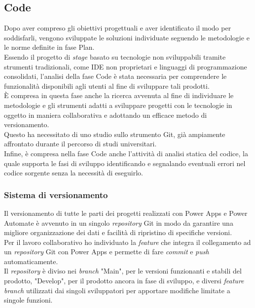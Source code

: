\subsection{Code}
Dopo aver compreso gli obiettivi progettuali e aver identificato il modo per soddisfarli, vengono sviluppate le soluzioni individuate seguendo le metodologie e le norme definite in fase Plan.\\
Essendo il progetto di \emph{stage} basato su tecnologie non sviluppabili tramite strumenti tradizionali, come IDE non proprietari e linguaggi di programmazione consolidati, l'analisi della fase Code è stata necessaria per comprendere le funzionalità disponibili agli utenti al fine di sviluppare tali prodotti.\\
È compresa in questa fase anche la ricerca avvenuta al fine di individuare le metodologie e gli strumenti adatti a sviluppare progetti con le tecnologie in oggetto in maniera collaborativa e adottando un efficace metodo di versionamento.\\
Questo ha necessitato di uno studio sullo strumento Git, già ampiamente affrontato durante il percorso di studi universitari.\\
Infine, è compresa nella fase Code anche l'attività di analisi statica del codice, la quale supporta le fasi di sviluppo identificando e segnalando eventuali errori nel codice sorgente senza la necessità di eseguirlo.

\subsubsection*{Sistema di versionamento}
Il versionamento di tutte le parti dei progetti realizzati con Power Apps e Power Automate è avvenuto in un singolo \emph{repository} Git in modo da garantire una migliore organizzazione dei dati e facilità di ripristino di specifiche versioni.\\
Per il lavoro collaborativo ho individuato la \emph{feature} che integra il collegamento ad un \emph{repository} Git con Power Apps e permette di fare \emph{commit} e \emph{push} automaticamente.\\
Il \emph{repository} è diviso nei \emph{branch} "Main", per le versioni funzionanti e stabili del prodotto, "Develop", per il prodotto ancora in fase di sviluppo, e diversi \emph{feature branch} utilizzati dai singoli sviluppatori per apportare modifiche limitate a singole funzioni.\\

